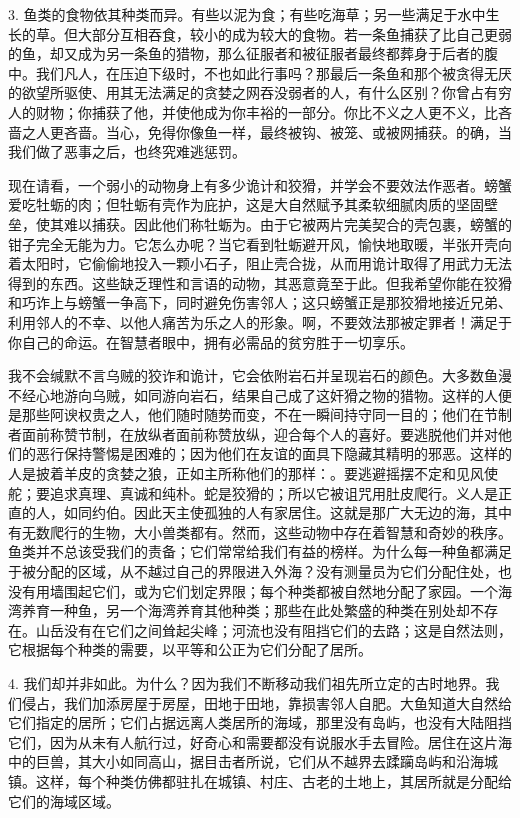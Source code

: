 3. 鱼类的食物依其种类而异。有些以泥为食；有些吃海草；另一些满足于水中生长的草。但大部分互相吞食，较小的成为较大的食物。若一条鱼捕获了比自己更弱的鱼，却又成为另一条鱼的猎物，那么征服者和被征服者最终都葬身于后者的腹中。我们凡人，在压迫下级时，不也如此行事吗？那最后一条鱼和那个被贪得无厌的欲望所驱使、用其无法满足的贪婪之网吞没弱者的人，有什么区别？你曾占有穷人的财物；你捕获了他，并使他成为你丰裕的一部分。你比不义之人更不义，比吝啬之人更吝啬。当心，免得你像鱼一样，最终被钩、被笼、或被网捕获。的确，当我们做了恶事之后，也终究难逃惩罚。\par

现在请看，一个弱小的动物身上有多少诡计和狡猾，并学会不要效法作恶者。螃蟹爱吃牡蛎的肉；但牡蛎有壳作为庇护，这是大自然赋予其柔软细腻肉质的坚固壁垒，使其难以捕获。因此他们称牡蛎为。由于它被两片完美契合的壳包裹，螃蟹的钳子完全无能为力。它怎么办呢？当它看到牡蛎避开风，愉快地取暖，半张开壳向着太阳时，它偷偷地投入一颗小石子，阻止壳合拢，从而用诡计取得了用武力无法得到的东西。这些缺乏理性和言语的动物，其恶意竟至于此。但我希望你能在狡猾和巧诈上与螃蟹一争高下，同时避免伤害邻人；这只螃蟹正是那狡猾地接近兄弟、利用邻人的不幸、以他人痛苦为乐之人的形象。啊，不要效法那被定罪者！满足于你自己的命运。在智慧者眼中，拥有必需品的贫穷胜于一切享乐。\par

我不会缄默不言乌贼的狡诈和诡计，它会依附岩石并呈现岩石的颜色。大多数鱼漫不经心地游向乌贼，如同游向岩石，结果自己成了这奸猾之物的猎物。这样的人便是那些阿谀权贵之人，他们随时随势而变，不在一瞬间持守同一目的；他们在节制者面前称赞节制，在放纵者面前称赞放纵，迎合每个人的喜好。要逃脱他们并对他们的恶行保持警惕是困难的；因为他们在友谊的面具下隐藏其精明的邪恶。这样的人是披着羊皮的贪婪之狼，正如主所称他们的那样：。要逃避摇摆不定和见风使舵；要追求真理、真诚和纯朴。蛇是狡猾的；所以它被诅咒用肚皮爬行。义人是正直的人，如同约伯。因此天主使孤独的人有家居住。这就是那广大无边的海，其中有无数爬行的生物，大小兽类都有。然而，这些动物中存在着智慧和奇妙的秩序。鱼类并不总该受我们的责备；它们常常给我们有益的榜样。为什么每一种鱼都满足于被分配的区域，从不越过自己的界限进入外海？没有测量员为它们分配住处，也没有用墙围起它们，或为它们划定界限；每个种类都被自然地分配了家园。一个海湾养育一种鱼，另一个海湾养育其他种类；那些在此处繁盛的种类在别处却不存在。山岳没有在它们之间耸起尖峰；河流也没有阻挡它们的去路；这是自然法则，它根据每个种类的需要，以平等和公正为它们分配了居所。\par

4. 我们却并非如此。为什么？因为我们不断移动我们祖先所立定的古时地界。我们侵占，我们加添房屋于房屋，田地于田地，靠损害邻人自肥。大鱼知道大自然给它们指定的居所；它们占据远离人类居所的海域，那里没有岛屿，也没有大陆阻挡它们，因为从未有人航行过，好奇心和需要都没有说服水手去冒险。居住在这片海中的巨兽，其大小如同高山，据目击者所说，它们从不越界去蹂躏岛屿和沿海城镇。这样，每个种类仿佛都驻扎在城镇、村庄、古老的土地上，其居所就是分配给它们的海域区域。\par

